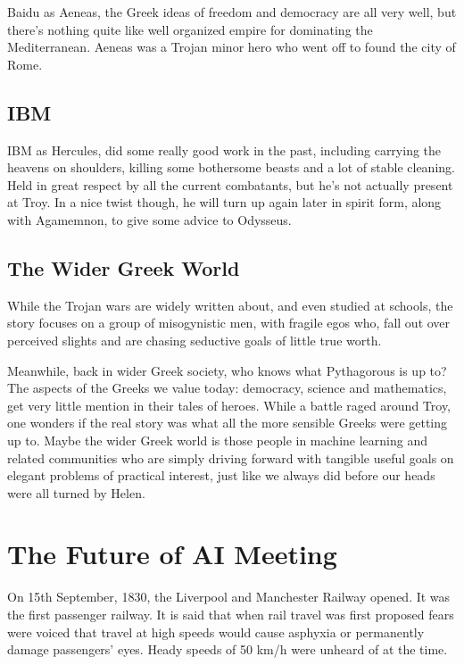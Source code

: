 \documentclass[a4paper]{caesar_book}
\let\oldchapter\chapter
\def\chapter{%
  \setcounter{footnote}{0}%
  \oldchapter
}
\begin{document}
Baidu as Aeneas, the Greek ideas of freedom and democracy are all very well, but there’s nothing quite like well organized empire for dominating the Mediterranean. Aeneas was a Trojan minor hero who went off to found the city of Rome.

\section{IBM}

IBM as Hercules, did some really good work in the past, including carrying the heavens on shoulders, killing some bothersome beasts and a lot of stable cleaning. Held in great respect by all the current combatants, but he’s not actually present at Troy. In a nice twist though, he will turn up again later in spirit form, along with Agamemnon, to give some advice to Odysseus.

\section{The Wider Greek World}

While the Trojan wars are widely written about, and even studied at schools, the story focuses on a group of misogynistic men, with fragile egos who, fall out over perceived slights and are chasing seductive goals of little true worth.

Meanwhile, back in wider Greek society, who knows what Pythagorous is up to? The aspects of the Greeks we value today: democracy, science and mathematics, get very little mention in their tales of heroes. While a battle raged around Troy, one wonders if the real story was what all the more sensible Greeks were getting up to. Maybe the wider Greek world is those people in machine learning and related communities who are simply driving forward with tangible useful goals on elegant problems of practical interest, just like we always did before our heads were all turned by Helen.

\chapter{The Future of AI Meeting}

On 15th September, 1830, the Liverpool and Manchester Railway opened. It was the first passenger railway. It is said that when rail travel was first proposed fears were voiced that travel at high speeds would cause asphyxia or permanently damage passengers’ eyes. Heady speeds of 50 km/h were unheard of at the time.
\end{document}
